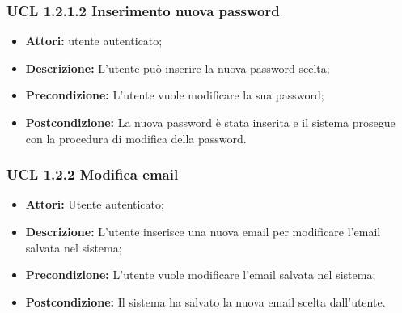 \hypertarget{L1.2.1.2}{}
\subsubsection{UCL 1.2.1.2 Inserimento nuova password}
\begin{itemize}
	\item \textbf{Attori: } utente autenticato;
	\item \textbf{Descrizione:} L'utente può inserire la nuova password scelta;
	\item \textbf{Precondizione:} L'utente vuole modificare la sua password;
	\item \textbf{Postcondizione:} La nuova password è stata inserita e il sistema prosegue con la procedura di modifica della password.
\end{itemize}

\hypertarget{L1.2.2}{}
\subsubsection{UCL 1.2.2  Modifica email}
\begin{itemize}
\item \textbf{Attori:} Utente autenticato;
\item \textbf{Descrizione:} L'utente inserisce una nuova email per modificare l'email salvata nel sistema;
\item \textbf{Precondizione:} L'utente vuole modificare l'email salvata nel sistema;
\item \textbf{Postcondizione:} Il sistema ha salvato la nuova email scelta dall'utente.
\end{itemize}

\hypertarget{L2}{}
